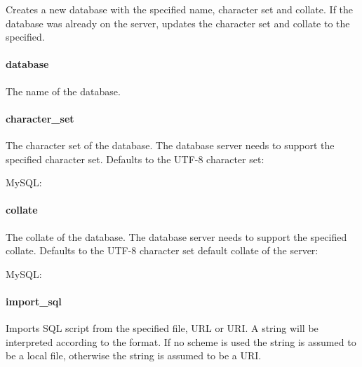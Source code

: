 Creates a new database with the specified name, character set and collate.
If the database was already on the server, updates the character set and collate
to the specified.

\paragraph{database}


The name of the database.

\paragraph{character\_set}


The character set of the database. The database server needs to support the
specified character set.
Defaults to the UTF-8 character set:

\begin{compactitem}
\item MySQL: 
\end{compactitem}

\paragraph{collate}


The collate of the database. The database server needs to support the
specified collate. Defaults to the UTF-8 character set default collate of
the server:

\begin{compactitem}
\item MySQL: 
\end{compactitem}

\paragraph{import\_sql}


Imports SQL script from the specified file, URL or URI. A string will be
interpreted according to the format. If no scheme is used the string
is assumed to be a local file, otherwise the string is assumed to be a URI.

